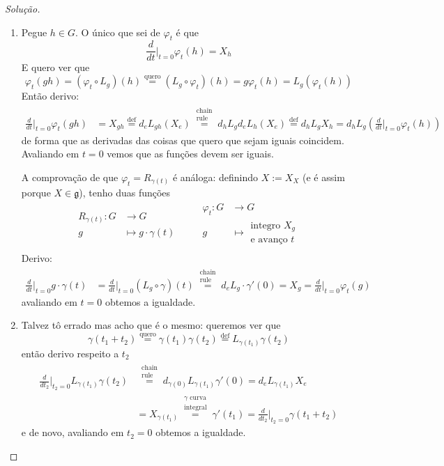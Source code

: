 \begin{proof}[Solução]\leavevmode
\begin{enumerate}
\item Pegue \(h \in G\). O único que sei de \(\varphi_t\) é que
	\[\frac{d}{dt}\Big|_{t=0}\varphi_t(h)=X_h\]
E quero ver que
\[\varphi_t(gh)=(\varphi_t \circ L_g)(h)\overset{\text{quero} }{=}(L_g \circ \varphi_t)(h)=g\varphi_t(h)=L_g(\varphi_t(h))\]
Então derivo:
\begin{align*}
\frac{d}{dt}\Big|_{t=0}\varphi_t(gh)&=X_{gh}\overset{\operatorname{def}}{=}d_eL_{gh}(X_e)\overset{\substack{\text{chain}  \\ \text{rule}} }{=}d_hL_gd_eL_h(X_e)\overset{\operatorname{def}}{=}d_hL_gX_h=d_hL_g\left(\frac{d}{dt}\Big|_{t=0}\varphi_t(h)\right) 
\end{align*}
de forma que as derivadas das coisas que quero que sejam iguais coincidem. Avaliando em \(t=0\) vemos que as funções devem ser iguais.

A comprovação de que \(\varphi_t=R_{\gamma(t)}\) é análoga: definindo \(X:=X_{X}\) (e é assim porque \(X\in \mathfrak{g}\)), tenho duas funções
\begin{align*}
\begin{aligned}
R_{\gamma(t)}: G &\longrightarrow G \\
	g &\longmapsto g\cdot\gamma(t)
\end{aligned}\qquad \begin{aligned}
\varphi_t: G &\longrightarrow G \\
g &\longmapsto \substack{\text{integro \(X_g\)}\\\text{e avanço \(t\)} }
\end{aligned}
\end{align*}
Derivo:
\begin{align*}
	\frac{d}{dt}\Big|_{t=0}g\cdot \gamma(t)&=\frac{d}{dt}\Big|_{t=0}(L_g \circ \gamma)(t)\overset{\substack{\text{chain}\\\text{rule}}}{=}d_eL_g\cdot \gamma'(0)=X_g=\frac{d}{dt}\Big|_{t=0}\varphi_t(g)
\end{align*}
avaliando em \(t=0\) obtemos a igualdade.

\item  Talvez tô errado mas acho que é o mesmo: queremos ver que
	\[\gamma(t_1+t_2)\overset{\text{quero}}{=}\gamma(t_1)\gamma(t_2)\overset{\operatorname{def}}{=}L_{\gamma(t_1)}\gamma(t_2)\]
então derivo respeito a \(t_2\) 
\begin{align*}
\frac{d}{dt_2}\Big|_{t_2=0}L_{\gamma(t_1)}\gamma(t_2)&\overset{\substack{\text{chain}\\\text{rule}}}{=}d_{\gamma(0)}L_{\gamma(t_1)}\gamma'(0)=d_eL_{\gamma(t_1)}X_e\\&=X_{\gamma(t_1)}\overset{\substack{\text{\(\gamma\) curva}  \\ \text{integral} }}{=} \gamma'(t_1)=\frac{d}{dt_2}\Big|_{t_2=0}\gamma(t_1+t_2)
\end{align*}
e de novo, avaliando em \(t_2=0\) obtemos a igualdade.


\end{enumerate}
\end{proof}
